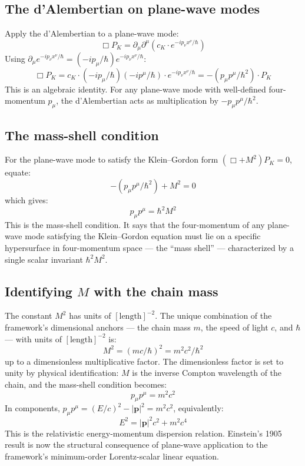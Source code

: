 \documentclass[11pt,a4paper]{article}
\begin{document}
\subsection{The d'Alembertian on plane-wave modes}

Apply the d'Alembertian to a plane-wave mode:
\[
\Box P_K = \partial_\mu\partial^\mu(c_K \cdot e^{-ip_\nu x^\nu/\hbar})
\]
Using $\partial_\mu e^{-ip_\nu x^\nu/\hbar} = (-ip_\mu/\hbar)e^{-ip_\nu x^\nu/\hbar}$:
\[
\Box P_K = c_K \cdot (-ip_\mu/\hbar)(-ip^\mu/\hbar)\cdot e^{-ip_\nu x^\nu/\hbar} = -(p_\mu p^\mu/\hbar^{2})\cdot P_K
\]
This is an algebraic identity. For any plane-wave mode with well-defined four-momentum $p_\mu$, the d'Alembertian acts as multiplication by $-p_\mu p^\mu/\hbar^2$.

\subsection{The mass-shell condition}

For the plane-wave mode to satisfy the Klein--Gordon form $(\Box + M^2)P_K = 0$, equate:
\[
-(p_\mu p^\mu/\hbar^{2}) + M^{2} = 0
\]
which gives:
\[
p_\mu p^\mu = \hbar^{2}M^{2}
\]
This is the mass-shell condition. It says that the four-momentum of any plane-wave mode satisfying the Klein--Gordon equation must lie on a specific hypersurface in four-momentum space --- the ``mass shell'' --- characterized by a single scalar invariant $\hbar^2 M^2$.

\subsection{Identifying $M$ with the chain mass}

The constant $M^2$ has units of $[\text{length}]^{-2}$. The unique combination of the framework's dimensional anchors --- the chain mass $m$, the speed of light $c$, and $\hbar$ --- with units of $[\text{length}]^{-2}$ is:
\[
M^{2} = (mc/\hbar)^{2} = m^{2}c^{2}/\hbar^{2}
\]
up to a dimensionless multiplicative factor. The dimensionless factor is set to unity by physical identification: $M$ is the inverse Compton wavelength of the chain, and the mass-shell condition becomes:
\[
p_\mu p^\mu = m^{2}c^{2}
\]
In components, $p_\mu p^\mu = (E/c)^2 - |\mathbf{p}|^2 = m^2c^2$, equivalently:
\[
E^{2} = |\mathbf{p}|^{2}c^{2} + m^{2}c^{4}
\]
This is the relativistic energy-momentum dispersion relation. Einstein's 1905 result is now the structural consequence of plane-wave application to the framework's minimum-order Lorentz-scalar linear equation.
\end{document}
